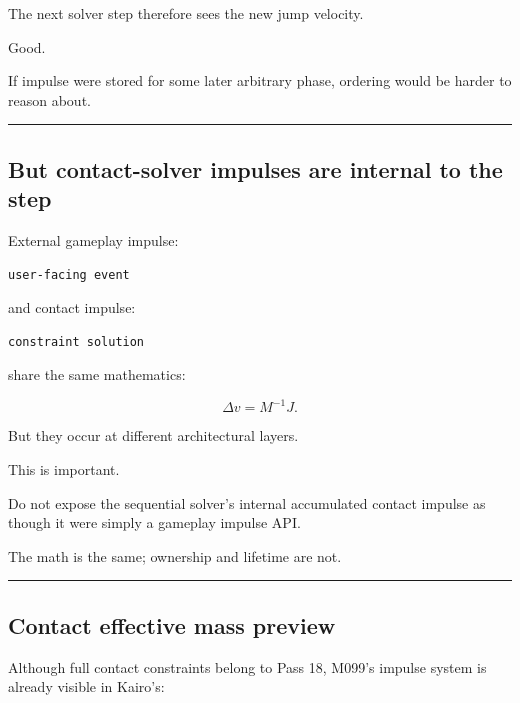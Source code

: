 The next solver step therefore sees the new jump velocity.

Good.

If impulse were stored for some later arbitrary phase, ordering would be harder to reason about.

\begin{center}\rule{0.5\linewidth}{0.5pt}\end{center}

\subsection{But contact-solver impulses are internal to the step}\label{06-engine-ii-ch037-but-contact-solver-impulses-are-internal-to-the-step}

\hypertarget{06-engine-ii-ch037-but-contact-solver-impulses-are-internal-to-the-step}{}

External gameplay impulse:

\begin{verbatim}
user-facing event
\end{verbatim}

and contact impulse:

\begin{verbatim}
constraint solution
\end{verbatim}

share the same mathematics:

\[
\Delta v=M^{-1}J.
\]

But they occur at different architectural layers.

This is important.

Do not expose the sequential solver's internal accumulated contact impulse as though it were simply a gameplay impulse API.

The math is the same; ownership and lifetime are not.

\begin{center}\rule{0.5\linewidth}{0.5pt}\end{center}

\subsection{Contact effective mass preview}\label{06-engine-ii-ch037-contact-effective-mass-preview}

\hypertarget{06-engine-ii-ch037-contact-effective-mass-preview}{}

Although full contact constraints belong to Pass 18, M099's impulse system is already visible in Kairo's:

